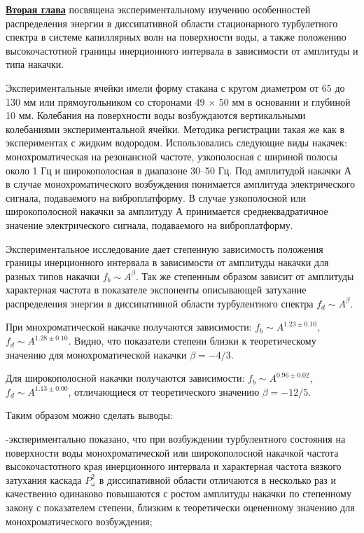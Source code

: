 \underline{\textbf{Вторая глава}} посвящена экспериментальному изучению особенностей распределения энергии в диссипативной области стационарного турбулетного спектра в системе капиллярных волн на поверхности воды, а также положению высокочастотной границы инерционного интервала в зависимости от амплитуды и типа накачки.

Экспериментальные ячейки имели форму стакана с кругом диаметром от 65 до 130 мм или прямоугольником со сторонами 49 $\times$ 50 мм в основании и глубиной 10 мм. Колебания на поверхности воды возбуждаются вертикальными колебаниями экспериментальной ячейки. Методика регистрации такая же как в экспериментах с жидким водородом. Использовались следующие виды накачек: монохромати­ческая на резонансной частоте, узкополосная с шириной полосы около 1 Гц и широкополосная в диапазоне 30–50 Гц. Под амплитудой накачки А в случае мо­нохроматического возбуждения понимается амплитуда электрического сигнала, подаваемого на виброплатформу. В случае узкополосной или широкополосной накачки за амплитуду А принимается среднеквадратичное значение электриче­ского сигнала, подаваемого на виброплатформу.

Экспериментальное исследование дает степенную зависимость положения границы инерционного интервала в зависимости от амплитуды накачки для разных типов накачки $f_b \sim A^\beta$. Так же степенным образом зависит от амплитуды характерная частота в показателе экспоненты описывающей затухание распределения энергии в диссипативной области турбулентного спектра $f_d \sim A^\beta$.

При мнохроматической накачке получаются зависимости: $f_b \sim A^{1.23 \pm 0.10}$,  $f_d \sim A^{1.28 \pm 0.10}$. Видно, что показатели степени близки к теоретическому значению для монохроматической накачки $\beta = -4/3$.

Для широкополосной накачки получаются зависимости: $f_b \sim A^{0.96 \pm 0.02}$,  $f_d \sim A^{1.13 \pm 0.00}$, отличающиеся от теоретического значению $\beta = -12/5$.

Таким образом можно сделать выводы:

-экспериментально показано, что при возбуждении турбулент­ного состояния на поверхности воды монохроматической или широкополосной накачкой частота высокочастотного края инерционного интервала и характер­ная частота вязкого затухания каскада $P_\omega^2$ в диссипативной области отличаются в несколько раз и качественно одинаково повышаются с ростом амплитуды на­качки по степенному закону с показателем степени, близким к теоретически оцененному значению для монохроматического возбуждения;

